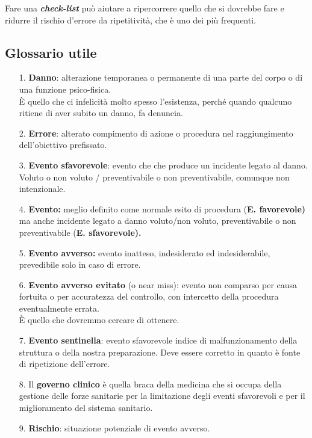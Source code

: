 Fare una \emph{\textbf{check-list}} può aiutare a ripercorrere quello
che si dovrebbe fare e ridurre il rischio d'errore da ripetitività, che
è uno dei più frequenti.

\subsection{Glossario utile}

\begin{itemize}
\item[1.]
  \textbf{Danno}: alterazione temporanea o permanente di una parte del
  corpo o di una funzione psico-fisica.\\
  È quello che ci infelicità molto spesso l'esistenza, perché quando
  qualcuno ritiene di aver subito un danno, fa denuncia.
\item[2.]
  \textbf{Errore}: alterato compimento di azione o procedura nel
  raggiungimento dell'obiettivo prefissato.
\item[3.]
  \textbf{Evento sfavorevole}: evento che che produce un incidente
  legato al danno. Voluto o non voluto / preventivabile o non
  preventivabile, comunque non intenzionale.
\item[4.]
  \textbf{Evento:} meglio definito come normale esito di procedura
  (\textbf{E. favorevole)} ma anche incidente legato a danno voluto/non
  voluto, preventivabile o non preventivabile (\textbf{E. sfavorevole).}
\item[5.]
  \textbf{Evento avverso:} evento inatteso, indesiderato ed
  indesiderabile, prevedibile solo in caso di errore.
\item[6.]
  \textbf{Evento avverso evitato} (o near miss): evento non comparso per
  causa fortuita o per accuratezza del controllo, con intercetto della
  procedura eventualmente errata.\\
  È quello che dovremmo cercare di ottenere.
\item[7.]
  \textbf{Evento sentinella}: evento sfavorevole indice di
  malfunzionamento della struttura o della nostra preparazione. Deve
  essere corretto in quanto è fonte di ripetizione dell'errore.
\item[8.]
  Il \textbf{governo clinico} è quella braca della medicina che si
  occupa della gestione delle forze sanitarie per la limitazione degli
  eventi sfavorevoli e per il miglioramento del sistema sanitario.
\item[9.]
  \textbf{Rischio}: situazione potenziale di evento avverso.
\end{itemize}

